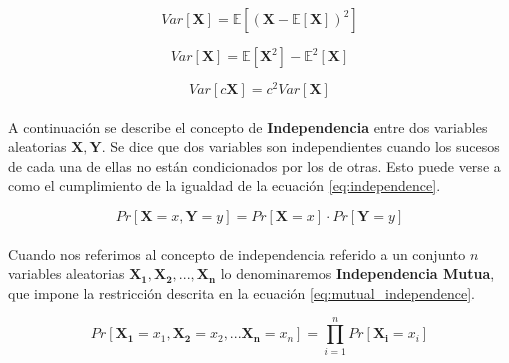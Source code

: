 \documentclass{subfiles}
\begin{document}
        \begin{equation}
        \label{eq:variance}
          Var[\boldsymbol{X}] = \mathbb{E}[(\boldsymbol{X} - \mathbb{E}[\boldsymbol{X}])^2]
        \end{equation}

        \begin{equation}
        \label{eq:variance_p1}
          Var[\boldsymbol{X}] = \mathbb{E}[\boldsymbol{X}^2] - \mathbb{E}^2[\boldsymbol{X}]
        \end{equation}

        \begin{equation}
        \label{eq:variance_p2}
          Var[c\boldsymbol{X}] = c^2Var[\boldsymbol{X}]
        \end{equation}

        \paragraph{}
        A continuación se describe el concepto de \textbf{Independencia} entre dos variables aleatorias $\boldsymbol{X}, \boldsymbol{Y}$. Se dice que dos variables son independientes cuando los sucesos de cada una de ellas no están condicionados por los de otras. Esto puede verse a como el cumplimiento de la igualdad de la ecuación \eqref{eq:independence}.

        \begin{equation}
        \label{eq:independence}
          Pr[\boldsymbol{X} = x, \boldsymbol{Y} = y] = Pr[\boldsymbol{X} = x] \cdot Pr[\boldsymbol{Y} = y]
        \end{equation}

        \paragraph{}
        Cuando nos referimos al concepto de independencia referido a un conjunto $n$ variables aleatorias $\boldsymbol{X_1}, \boldsymbol{X_2},..., \boldsymbol{X_n}$ lo denominaremos \textbf{Independencia Mutua}, que impone la restricción descrita en la ecuación \eqref{eq:mutual_independence}.

        \begin{equation}
        \label{eq:mutual_independence}
          Pr[\boldsymbol{X_1} = x_1, \boldsymbol{X_2} = x_2,... \boldsymbol{X_n} = x_n] = \prod_{i=1}^n Pr[\boldsymbol{X_i} = x_i]
        \end{equation}
\end{document}
